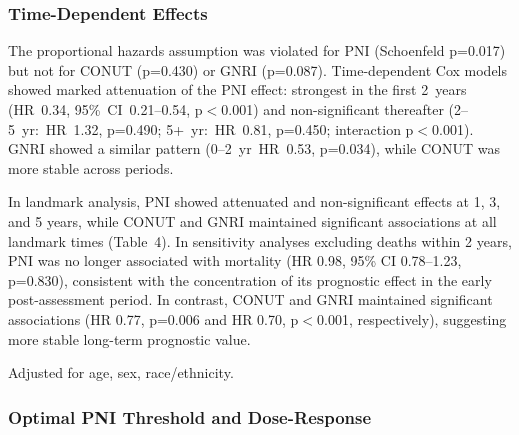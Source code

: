\documentclass[review]{elsarticle}
\begin{document}
\subsubsection{Time-Dependent Effects}

The proportional hazards assumption was violated for PNI (Schoenfeld p=0.017) but not for CONUT (p=0.430) or GNRI (p=0.087). Time-dependent Cox models showed marked attenuation of the PNI effect: strongest in the first 2~years (HR~0.34, 95\%~CI~0.21--0.54, p$<$0.001) and non-significant thereafter (2--5~yr:~HR~1.32, p=0.490; 5+~yr:~HR~0.81, p=0.450; interaction p$<$0.001). GNRI showed a similar pattern (0--2~yr~HR~0.53, p=0.034), while CONUT was more stable across periods.

In landmark analysis, PNI showed attenuated and non-significant effects at 1, 3, and 5 years, while CONUT and GNRI maintained significant associations at all landmark times (Table~4). In sensitivity analyses excluding deaths within 2 years, PNI was no longer associated with mortality (HR 0.98, 95\% CI 0.78--1.23, p=0.830), consistent with the concentration of its prognostic effect in the early post-assessment period. In contrast, CONUT and GNRI maintained significant associations (HR 0.77, p=0.006 and HR 0.70, p$<$0.001, respectively), suggesting more stable long-term prognostic value.

\begin{table}[h]
\caption{GI Cancer: Landmark Analysis---Adjusted HR per 1-SD}
\label{tab:gi_landmark}
\centering{}
\par\footnotesize Adjusted for age, sex, race/ethnicity.
\end{table}

\subsubsection{Optimal PNI Threshold and Dose-Response}
\end{document}
